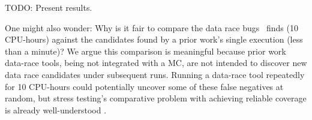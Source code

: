 TODO: Present results.

One might also wonder: Why is it fair to compare the data race bugs \quicksand~finds (10 CPU-hours)
against the candidates found by a prior work's single execution (less than a minute)?
We argue this comparison is meaningful because prior work data-race tools, being not integrated with a MC,
are not intended to discover new data race candidates under subsequent runs.
Running a data-race tool repeatedly for 10 CPU-hours could potentially uncover some of these false negatives at random,
but stress testing's comparative problem with achieving reliable coverage is already well-understood
\cite{chess-icb,gambit}.



